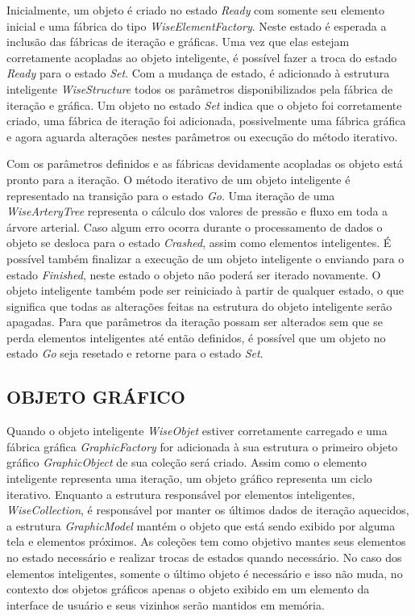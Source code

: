 \documentclass[
        english,			
        brazil			        %
        ,<...>]{abntbibufjf}
\begin{document}
Inicialmente, um objeto é criado no estado \textit{Ready} com somente seu elemento inicial e uma fábrica do tipo \textit{WiseElementFactory}. Neste estado é esperada a inclusão das fábricas de iteração e gráficas. Uma vez que elas estejam corretamente acopladas ao objeto inteligente, é possível fazer a troca do estado \textit{Ready} para o estado \textit{Set}. Com a mudança de estado, é adicionado à estrutura inteligente \textit{WiseStructure} todos os parâmetros disponibilizados pela fábrica de iteração e gráfica. Um objeto no estado \textit{Set} indica que o objeto foi corretamente criado, uma fábrica de iteração foi adicionada, possivelmente uma fábrica gráfica e agora aguarda alterações nestes parâmetros ou execução do método iterativo.

Com os parâmetros definidos e as fábricas devidamente acopladas os objeto está pronto para a iteração. O método iterativo de um objeto inteligente é representado na transição para o estado \textit{Go}. Uma iteração de uma \textit{WiseArteryTree} representa o cálculo dos valores de pressão e fluxo em toda a árvore arterial. Caso algum erro ocorra durante o processamento de dados o objeto se desloca para o estado \textit{Crashed}, assim como elementos inteligentes. É possível também finalizar a execução de um objeto inteligente o enviando para o estado \textit{Finished}, neste estado o objeto não poderá ser iterado novamente. O objeto inteligente também pode ser reiniciado à partir de qualquer estado, o que significa que todas as alterações feitas na estrutura do objeto inteligente serão apagadas. Para que parâmetros da iteração possam ser alterados sem que se perda elementos inteligentes até então definidos, é possível que um objeto no estado \textit{Go} seja resetado e retorne para o estado \textit{Set}.

\subsection{OBJETO GRÁFICO}\label{sec:objeto_grafico}


Quando o objeto inteligente \textit{WiseObjet} estiver corretamente carregado e uma fábrica gráfica \textit{GraphicFactory} for adicionada à sua estrutura o primeiro objeto gráfico \textit{GraphicObject} de sua coleção será criado. Assim como o elemento inteligente representa uma iteração, um objeto gráfico representa um ciclo iterativo. Enquanto a estrutura responsável por elementos inteligentes, \textit{WiseCollection}, é responsável por manter os últimos dados de iteração aquecidos, a estrutura \textit{GraphicModel} mantém o objeto que está sendo exibido por alguma tela e elementos próximos. As coleções tem como objetivo mantes seus elementos no estado necessário e realizar trocas de estados quando necessário. No caso dos elementos inteligentes, somente o último objeto é necessário e isso não muda, no contexto dos objetos gráficos apenas o objeto exibido em um elemento da interface de usuário e seus vizinhos serão mantidos em memória.
\end{document}
